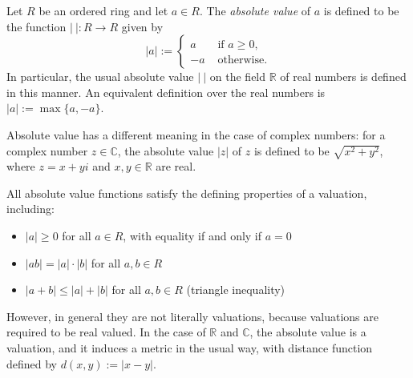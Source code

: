 \documentclass{article}
\begin{document}
Let $R$ be an ordered ring and let $a \in R$. The \emph{absolute value} of $a$ is defined to be the function $|\ |\colon R \to R$ given by
$$
|a| :=
\begin{cases}
a & \text{\ \ if } a \geq 0, \\
-a & \text{\ \ otherwise.}
\end{cases}
$$
In particular, the usual absolute value $|\ |$ on the field $\mathbb{R}$ of real numbers is defined in this manner. An equivalent definition over the real numbers is $|a| := \max\{a, -a\}$.

Absolute value has a different meaning in the case of complex numbers: for a complex number $z \in \mathbb{C}$, the absolute value $|z|$ of $z$ is defined to be $\sqrt{x^2+y^2}$, where $z = x+yi$ and $x,y \in \mathbb{R}$ are real.

All absolute value functions satisfy the defining properties of a valuation, including:
\begin{itemize}
\item $|a| \ge 0$ for all $a \in R$, with equality if and only if $a = 0$
\item $|ab| = |a| \cdot |b|$ for all $a,b \in R$
\item $|a+b| \le |a| + |b|$ for all $a, b \in R$ (triangle inequality)
\end{itemize}

However, in general they are not literally valuations, because valuations are required to be real valued.  In the case of $\mathbb{R}$ and $\mathbb{C}$, the absolute value is a valuation, and it induces a metric in the usual way, with distance function defined by $d(x,y) := |x-y|$.
\end{document}
